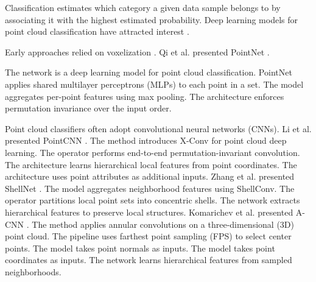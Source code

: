 Classification estimates which category a given data sample belongs to by associating it with the highest estimated probability.
Deep learning models for point cloud classification have attracted interest \cite{grandini2020metrics}.

Early approaches relied on voxelization \cite{Wu_2015_CVPR,7353481,Qi_2016_CVPR}.
Qi et al. presented PointNet \cite{DBLP:journals/corr/QiYSG17}.
  \begin{deletedblock}
  The network is a deep learning model for point cloud classification.
  PointNet applies shared multilayer perceptrons (MLPs) to each point in a set.
  The model aggregates per-point features using max pooling.
  The architecture enforces permutation invariance over the input order.
  \end{deletedblock}

\begin{deletedblock}
Point cloud classifiers often adopt convolutional neural networks (CNNs).
  Li et al. presented PointCNN \cite{NEURIPS2018_f5f8590c}.
    The method introduces X-Conv for point cloud deep learning.
    The operator performs end-to-end permutation-invariant convolution.
    The architecture learns hierarchical local features from point coordinates.
    The architecture uses point attributes as additional inputs.
  Zhang et al. presented ShellNet \cite{Zhang_2019_ICCV}.
    The model aggregates neighborhood features using ShellConv.
    The operator partitions local point sets into concentric shells.
    The network extracts hierarchical features to preserve local structures.
  Komarichev et al. presented A-CNN \cite{Komarichev_2019_CVPR}.
    The method applies annular convolutions on a three-dimensional (3D) point cloud.
    The pipeline uses farthest point sampling (FPS) to select center points.
    The model takes point normals as inputs.
    The model takes point coordinates as inputs.
    The network learns hierarchical features from sampled neighborhoods.
\end{deletedblock}

